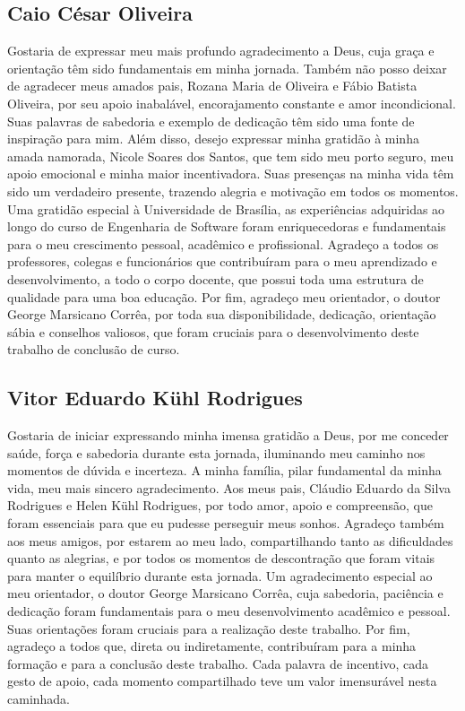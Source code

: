 \begin{agradecimentos}

\subsection*{Caio César Oliveira}

Gostaria de expressar meu mais profundo agradecimento a Deus, cuja graça e orientação têm sido fundamentais em minha jornada. Também não posso deixar de agradecer meus amados pais, Rozana Maria de Oliveira e Fábio Batista Oliveira, por seu apoio inabalável, encorajamento constante e amor incondicional. Suas palavras de sabedoria e exemplo de dedicação têm sido uma fonte de inspiração para mim. 
Além disso, desejo expressar minha gratidão à minha amada namorada, Nicole Soares dos Santos, que tem sido meu porto seguro, meu apoio emocional e minha maior incentivadora. Suas presenças na minha vida têm sido um verdadeiro presente, trazendo alegria e motivação em todos os momentos.
Uma gratidão especial à Universidade de Brasília, as experiências adquiridas ao longo do curso de Engenharia de Software foram enriquecedoras e fundamentais para o meu crescimento pessoal, acadêmico e profissional. Agradeço a todos os professores, colegas e funcionários que contribuíram para o meu aprendizado e desenvolvimento, a todo o corpo docente, que possui toda uma estrutura de qualidade para uma boa educação.
Por fim, agradeço  meu orientador, o doutor George Marsicano Corrêa, por toda sua disponibilidade, dedicação, orientação sábia e conselhos valiosos, que foram cruciais para o desenvolvimento deste trabalho de conclusão de curso.

\subsection*{Vitor Eduardo Kühl Rodrigues}

Gostaria de iniciar expressando minha imensa gratidão a Deus, por me conceder saúde, força e sabedoria durante esta jornada, iluminando meu caminho nos momentos de dúvida e incerteza. A minha família, pilar fundamental da minha vida, meu mais sincero agradecimento. Aos meus pais, Cláudio Eduardo da Silva Rodrigues e Helen Kühl Rodrigues, por todo amor, apoio e compreensão, que foram essenciais para que eu pudesse perseguir meus sonhos. Agradeço também aos meus amigos, por estarem ao meu lado, compartilhando tanto as dificuldades quanto as alegrias, e por todos os momentos de descontração que foram vitais para manter o equilíbrio durante esta jornada. Um agradecimento especial ao meu orientador, o doutor George Marsicano Corrêa, cuja sabedoria, paciência e dedicação foram fundamentais para o meu desenvolvimento acadêmico e pessoal. Suas orientações foram cruciais para a realização deste trabalho.  Por fim, agradeço a todos que, direta ou indiretamente, contribuíram para a minha formação e para a conclusão deste trabalho. Cada palavra de incentivo, cada gesto de apoio, cada momento compartilhado teve um valor imensurável nesta caminhada.

\end{agradecimentos}
